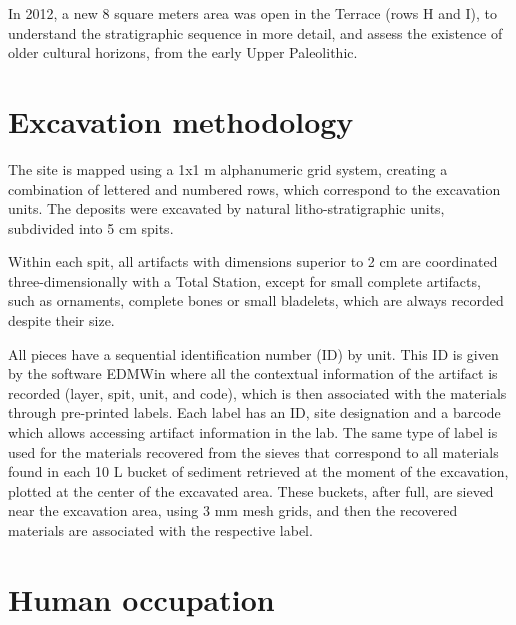 \documentclass[12pt,twoside]{reedthesis}
\begin{document}
In 2012, a new 8 square meters area was open in the Terrace (rows H and I), to understand the stratigraphic sequence in more detail, and assess the existence of older cultural horizons, from the early Upper Paleolithic.

\hypertarget{excavation-methodology}{%
\section{Excavation methodology}\label{excavation-methodology}}

The site is mapped using a 1x1 m alphanumeric grid system, creating a combination of lettered and numbered rows, which correspond to the excavation units. The deposits were excavated by natural litho-stratigraphic units, subdivided into 5 cm spits.

Within each spit, all artifacts with dimensions superior to 2 cm are coordinated three-dimensionally with a Total Station, except for small complete artifacts, such as ornaments, complete bones or small bladelets, which are always recorded despite their size.

All pieces have a sequential identification number (ID) by unit. This ID is given by the software EDMWin where all the contextual information of the artifact is recorded (layer, spit, unit, and code), which is then associated with the materials through pre-printed labels. Each label has an ID, site designation and a barcode which allows accessing artifact information in the lab. The same type of label is used for the materials recovered from the sieves that correspond to all materials found in each 10 L bucket of sediment retrieved at the moment of the excavation, plotted at the center of the excavated area. These buckets, after full, are sieved near the excavation area, using 3 mm mesh grids, and then the recovered materials are associated with the respective label.

\hypertarget{human-occupation}{%
\section{Human occupation}\label{human-occupation}}
\end{document}
